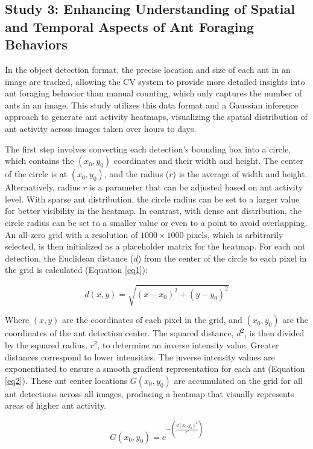 \subsection{Study 3: Enhancing Understanding of Spatial and Temporal Aspects of Ant Foraging Behaviors}

In the object detection format, the precise location and size of each ant in an image are tracked, allowing the CV system to provide more detailed insights into ant foraging behavior than manual counting, which only captures the number of ants in an image. This study utilizes this data format and a Gaussian inference approach to generate ant activity heatmaps, visualizing the spatial distribution of ant activity across images taken over hours to days.

The first step involves converting each detection's bounding box into a circle, which contains the $(x_0, y_0)$ coordinates and their width and height. The center of the circle is at $(x_0, y_0)$, and the radius ($r$) is the average of width and height. Alternatively, radius $r$ is a parameter that can be adjusted based on ant activity level. With sparse ant distribution, the circle radius can be set to a larger value for better visibility in the heatmap. In contrast, with dense ant distribution, the circle radius can be set to a smaller value or even to a point to avoid overlapping. An all-zero grid with a resolution of $1000 \times 1000$ pixels, which is arbitrarily selected, is then initialized as a placeholder matrix for the heatmap. For each ant detection, the Euclidean distance ($d$) from the center of the circle to each pixel in the grid is calculated (Equation \ref{eq1}):

\begin{equation}
d(x, y) = \sqrt{(x - x_0)^2 + (y - y_0)^2}
\label{eq1}
\end{equation}

Where $(x, y)$ are the coordinates of each pixel in the grid, and $(x_0, y_0)$ are the coordinates of the ant detection center. The squared distance, $d^2$, is then divided by the squared radius, $r^2$, to determine an inverse intensity value. Greater distances correspond to lower intensities. The inverse intensity values are exponentiated to ensure a smooth gradient representation for each ant (Equation \ref{eq2}). These ant center locations $G(x_0, y_0)$ are accumulated on the grid for all ant detections across all images, producing a heatmap that visually represents areas of higher ant activity.

\begin{equation}
G(x_0, y_0) = e^{- \left( \frac{d(x_0, y_0)^2}{r^2} \right)}
\label{eq2}
\end{equation}

